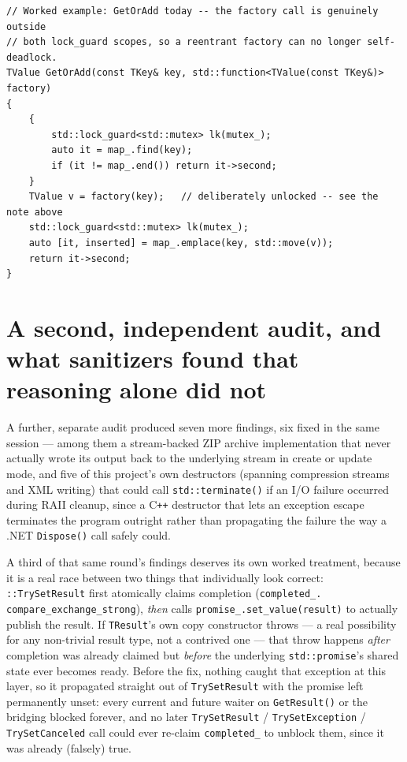 \begin{lstlisting}
// Worked example: GetOrAdd today -- the factory call is genuinely outside
// both lock_guard scopes, so a reentrant factory can no longer self-deadlock.
TValue GetOrAdd(const TKey& key, std::function<TValue(const TKey&)> factory)
{
    {
        std::lock_guard<std::mutex> lk(mutex_);
        auto it = map_.find(key);
        if (it != map_.end()) return it->second;
    }
    TValue v = factory(key);   // deliberately unlocked -- see the note above
    std::lock_guard<std::mutex> lk(mutex_);
    auto [it, inserted] = map_.emplace(key, std::move(v));
    return it->second;
}
\end{lstlisting}

\section[A second audit, and what sanitizers found that reasoning alone did not]{A second, independent audit, and what sanitizers found that reasoning alone did not}

A further, separate audit produced seven more findings, six fixed in the same session ---
among them a stream-backed ZIP archive implementation that never actually wrote its output
back to the underlying stream in create or update mode, and five of this project's own
destructors (spanning compression streams and XML writing) that could call
\texttt{std::terminate()} if an I/O failure occurred during RAII cleanup, since a
C\texttt{++} destructor that lets an exception escape terminates the program outright rather
than propagating the failure the way a .NET \texttt{Dispose()} call safely could.

A third of that same round's findings deserves its own worked treatment, because it is a real
race between two things that individually look correct: %
\texttt{::TrySetResult} first atomically claims completion (\texttt{completed\_.%
compare\_exchange\_strong}), \emph{then} calls \texttt{promise\_.set\_value(result)} to actually
publish the result. If \texttt{TResult}'s own copy constructor throws --- a real possibility for
any non-trivial result type, not a contrived one --- that throw happens \emph{after} completion
was already claimed but \emph{before} the underlying \texttt{std::promise}'s shared state ever
becomes ready. Before the fix, nothing caught that exception at this layer, so it propagated
straight out of \texttt{TrySetResult} with the promise left permanently unset: every current and
future waiter on \texttt{GetResult()} or the bridging  blocked forever, and no
later \texttt{TrySetResult} / \texttt{TrySetException} / \texttt{TrySetCanceled} call could ever
re-claim \texttt{completed\_} to unblock them, since it was already (falsely) true.

